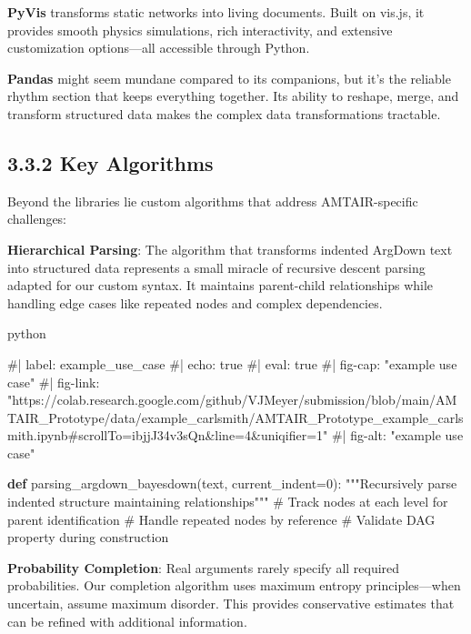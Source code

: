 \documentclass[
  11pt,
  letterpaper,
  openany]{book}
\newenvironment{Shaded}{\begin{snugshade}}{\end{snugshade}}
\newcommand{\CommentTok}[1]{\textcolor[rgb]{0.37,0.37,0.37}{#1}}
\newcommand{\DecValTok}[1]{\textcolor[rgb]{0.68,0.00,0.00}{#1}}
\newcommand{\KeywordTok}[1]{\textcolor[rgb]{0.00,0.23,0.31}{\textbf{#1}}}
\newcommand{\NormalTok}[1]{\textcolor[rgb]{0.00,0.23,0.31}{#1}}
\newcommand{\OperatorTok}[1]{\textcolor[rgb]{0.37,0.37,0.37}{#1}}
\begin{document}
\textbf{PyVis} transforms static networks into living documents. Built
on vis.js, it provides smooth physics simulations, rich interactivity,
and extensive customization options---all accessible through Python.

\textbf{Pandas} might seem mundane compared to its companions, but it's
the reliable rhythm section that keeps everything together. Its ability
to reshape, merge, and transform structured data makes the complex data
transformations tractable.

\subsection{3.3.2 Key Algorithms}\label{sec-key-algorithms}

Beyond the libraries lie custom algorithms that address AMTAIR-specific
challenges:

\textbf{Hierarchical Parsing}: The algorithm that transforms indented
ArgDown text into structured data represents a small miracle of
recursive descent parsing adapted for our custom syntax. It maintains
parent-child relationships while handling edge cases like repeated nodes
and complex dependencies.

python

\begin{Shaded}
\begin{Highlighting}[]
\CommentTok{\#| label: example\_use\_case}
\CommentTok{\#| echo: true}
\CommentTok{\#| eval: true}
\CommentTok{\#| fig{-}cap: "example use case"}
\CommentTok{\#| fig{-}link: "https://colab.research.google.com/github/VJMeyer/submission/blob/main/AMTAIR\_Prototype/data/example\_carlsmith/AMTAIR\_Prototype\_example\_carlsmith.ipynb\#scrollTo=ibjjJ34v3sQn\&line=4\&uniqifier=1"}
\CommentTok{\#| fig{-}alt: "example use case"}

\KeywordTok{def}\NormalTok{ parsing\_argdown\_bayesdown(text, current\_indent}\OperatorTok{=}\DecValTok{0}\NormalTok{):}
    \CommentTok{"""Recursively parse indented structure maintaining relationships"""}
    \CommentTok{\# Track nodes at each level for parent identification}
    \CommentTok{\# Handle repeated nodes by reference}
    \CommentTok{\# Validate DAG property during construction}
\end{Highlighting}
\end{Shaded}

\textbf{Probability Completion}: Real arguments rarely specify all
required probabilities. Our completion algorithm uses maximum entropy
principles---when uncertain, assume maximum disorder. This provides
conservative estimates that can be refined with additional information.
\end{document}
